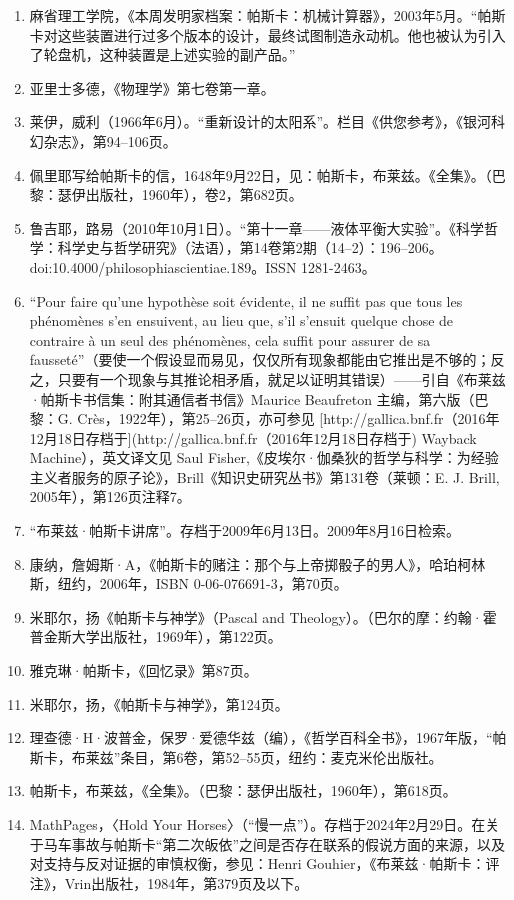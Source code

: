 \begin{enumerate}
\item 麻省理工学院，《本周发明家档案：帕斯卡：机械计算器》，2003年5月。“帕斯卡对这些装置进行过多个版本的设计，最终试图制造永动机。他也被认为引入了轮盘机，这种装置是上述实验的副产品。”
\item 亚里士多德，《物理学》第七卷第一章。
\item 莱伊，威利（1966年6月）。“重新设计的太阳系”。栏目《供您参考》，《银河科幻杂志》，第94–106页。
\item 佩里耶写给帕斯卡的信，1648年9月22日，见：帕斯卡，布莱兹。《全集》。（巴黎：瑟伊出版社，1960年），卷2，第682页。
\item 鲁吉耶，路易（2010年10月1日）。“第十一章——液体平衡大实验”。《科学哲学：科学史与哲学研究》（法语），第14卷第2期（14–2）：196–206。doi:10.4000/philosophiascientiae.189。ISSN 1281-2463。
\item “Pour faire qu'une hypothèse soit évidente, il ne suffit pas que tous les phénomènes s'en ensuivent, au lieu que, s'il s'ensuit quelque chose de contraire à un seul des phénomènes, cela suffit pour assurer de sa fausseté”（要使一个假设显而易见，仅仅所有现象都能由它推出是不够的；反之，只要有一个现象与其推论相矛盾，就足以证明其错误）——引自《布莱兹·帕斯卡书信集：附其通信者书信》Maurice Beaufreton 主编，第六版（巴黎：G. Crès，1922年），第25–26页，亦可参见 [http://gallica.bnf.fr（2016年12月18日存档于](http://gallica.bnf.fr（2016年12月18日存档于) Wayback Machine），英文译文见 Saul Fisher,《皮埃尔·伽桑狄的哲学与科学：为经验主义者服务的原子论》，Brill《知识史研究丛书》第131卷（莱顿：E. J. Brill, 2005年），第126页注释7。
\item “布莱兹·帕斯卡讲席”。存档于2009年6月13日。2009年8月16日检索。
\item 康纳，詹姆斯·A，《帕斯卡的赌注：那个与上帝掷骰子的男人》，哈珀柯林斯，纽约，2006年，ISBN 0-06-076691-3，第70页。
\item 米耶尔，扬《帕斯卡与神学》（Pascal and Theology）。（巴尔的摩：约翰·霍普金斯大学出版社，1969年），第122页。
\item 雅克琳·帕斯卡，《回忆录》第87页。
\item 米耶尔，扬，《帕斯卡与神学》，第124页。
\item 理查德·H·波普金，保罗·爱德华兹（编），《哲学百科全书》，1967年版，“帕斯卡，布莱兹”条目，第6卷，第52–55页，纽约：麦克米伦出版社。
\item 帕斯卡，布莱兹，《全集》。（巴黎：瑟伊出版社，1960年），第618页。
\item MathPages，〈Hold Your Horses〉（“慢一点”）。存档于2024年2月29日。在关于马车事故与帕斯卡“第二次皈依”之间是否存在联系的假说方面的来源，以及对支持与反对证据的审慎权衡，参见：Henri Gouhier，《布莱兹·帕斯卡：评注》，Vrin出版社，1984年，第379页及以下。

\end{enumerate}
